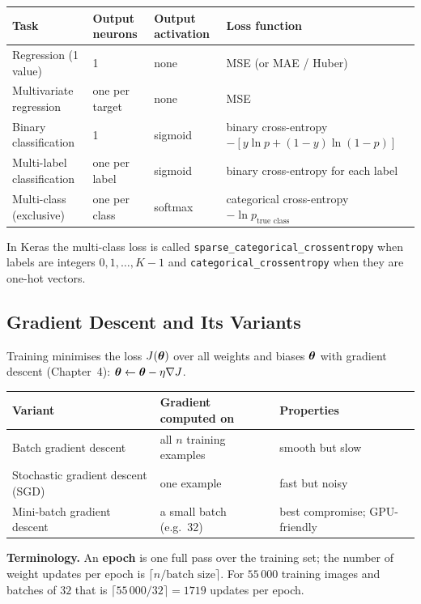 \begin{center}
\small
\begin{tabular}{@{}p{3.2cm}p{2.5cm}p{3.1cm}p{4.4cm}@{}}
\toprule
\textbf{Task} & \textbf{Output neurons} & \textbf{Output activation} & \textbf{Loss function}\\
\midrule
Regression (1 value) & 1 & none & MSE (or MAE / Huber)\\
Multivariate regression & one per target & none & MSE\\
Binary classification & 1 & sigmoid & binary cross-entropy $-[y\ln p+(1-y)\ln(1-p)]$\\
Multi-label classification & one per label & sigmoid & binary cross-entropy for each label\\
Multi-class (exclusive) & one per class & softmax & categorical cross-entropy $-\ln p_{\text{true class}}$\\
\bottomrule
\end{tabular}
\end{center}

\noindent In Keras the multi-class loss is called \texttt{sparse\_categorical\_crossentropy} when labels are integers $0,1,\dots,K-1$ and \texttt{categorical\_crossentropy} when they are one-hot vectors.

\subsection{Gradient Descent and Its Variants}

Training minimises the loss $J(\boldsymbol{\theta})$ over all weights and biases $\boldsymbol{\theta}$ with gradient descent (Chapter~4): $\boldsymbol{\theta}\leftarrow\boldsymbol{\theta}-\eta\nabla J$.

\begin{center}
\begin{tabular}{@{}p{3.6cm}p{5.4cm}p{4.2cm}@{}}
\toprule
\textbf{Variant} & \textbf{Gradient computed on} & \textbf{Properties}\\
\midrule
Batch gradient descent & all $n$ training examples & smooth but slow\\
Stochastic gradient descent (SGD) & one example & fast but noisy\\
Mini-batch gradient descent & a small batch (e.g.\ 32) & best compromise; GPU-friendly\\
\bottomrule
\end{tabular}
\end{center}

\noindent \textbf{Terminology.} An \textbf{epoch} is one full pass over the training set; the number of weight updates per epoch is $\lceil n/\text{batch size}\rceil$. For $55\,000$ training images and batches of $32$ that is $\lceil55\,000/32\rceil=1719$ updates per epoch.

